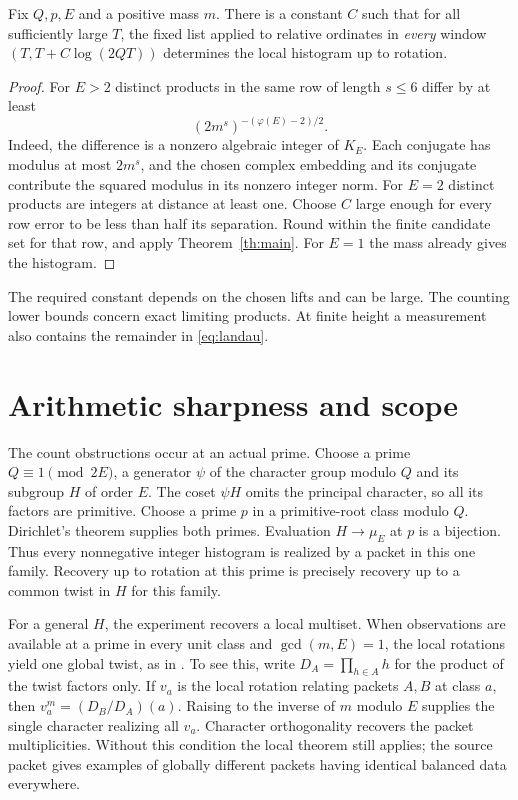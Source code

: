 \documentclass[11pt,letterpaper]{article}
\begin{document}
\begin{corollary}\label{cor:window}
Fix $Q,p,E$ and a positive mass $m$. There is a constant $C$ such that for all sufficiently large $T$, the fixed list applied to relative ordinates in \emph{every} window $(T,T+C\log(2QT))$ determines the local histogram up to rotation.
\end{corollary}
\begin{proof}
For $E>2$ distinct products in the same row of length $s\le6$ differ by at least
\[
                   (2m^s)^{-(\varphi(E)-2)/2}.
\]
Indeed, the difference is a nonzero algebraic integer of $K_E$. Each conjugate has modulus at most $2m^s$, and the chosen complex embedding and its conjugate contribute the squared modulus in its nonzero integer norm. For $E=2$ distinct products are integers at distance at least one. Choose $C$ large enough for every row error to be less than half its separation. Round within the finite candidate set for that row, and apply Theorem~\ref{th:main}. For $E=1$ the mass already gives the histogram.
\end{proof}
The required constant depends on the chosen lifts and can be large. The counting lower bounds concern exact limiting products. At finite height a measurement also contains the remainder in \eqref{eq:landau}.

\newpage
\section{Arithmetic sharpness and scope}
The count obstructions occur at an actual prime. Choose a prime $Q\equiv1\pmod{2E}$, a generator $\psi$ of the character group modulo $Q$ and its subgroup $H$ of order $E$. The coset $\psi H$ omits the principal character, so all its factors are primitive. Choose a prime $p$ in a primitive-root class modulo $Q$. Dirichlet's theorem supplies both primes. Evaluation $H\to\mu_E$ at $p$ is a bijection. Thus every nonnegative integer histogram is realized by a packet in this one family. Recovery up to rotation at this prime is precisely recovery up to a common twist in $H$ for this family.

For a general $H$, the experiment recovers a local multiset. When observations are available at a prime in every unit class and $\gcd(m,E)=1$, the local rotations yield one global twist, as in \cite{Packet}. To see this, write $D_A=\prod_{h\in A}h$ for the product of the twist factors only. If $v_a$ is the local rotation relating packets $A,B$ at class $a$, then $v_a^m=(D_B/D_A)(a)$. Raising to the inverse of $m$ modulo $E$ supplies the single character realizing all $v_a$. Character orthogonality recovers the packet multiplicities. Without this condition the local theorem still applies; the source packet gives examples of globally different packets having identical balanced data everywhere.
\end{document}
